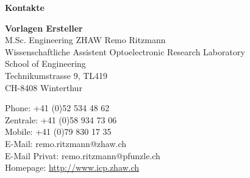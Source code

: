 %
%

\textbf{Kontakte}


\textbf{Vorlagen Ersteller} \\
M.Sc. Engineering ZHAW Remo Ritzmann \\
Wissenschaftliche Assistent Optoelectronic Research Laboratory\\
School of Engineering\\
Technikumstrasse 9, TL419\\
CH-8408 Winterthur

Phone: +41 (0)52 534 48 62\\
Zentrale: +41 (0)58 934 73 06\\
Mobile: +41 (0)79 830 17 35\\
E-Mail: remo.ritzmann@zhaw.ch\\
E-Mail Privat: remo.ritzmann@pfunzle.ch\\
Homepage: \url{http://www.icp.zhaw.ch}\vskip 15pt

